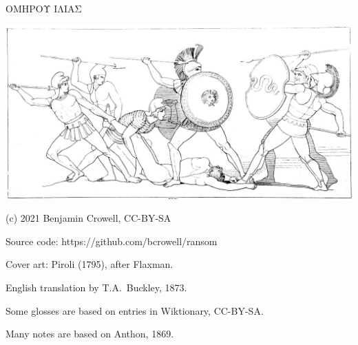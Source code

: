\pagestyle{empty}

\vspace{25mm} %

\begin{center}

{\huge ΟΜΗΡΟΥ ΙΛΙΑΣ }

\vspace{10mm}

\includegraphics{iliad/figs/ajax-and-patroclus-body}

\vfill

\end{center}

\pagebreak

(c) 2021 Benjamin Crowell, CC-BY-SA

Source code: https://github.com/bcrowell/ransom

Cover art: Piroli (1795), after Flaxman.


English translation by T.A.~Buckley, 1873.

Some glosses are based on entries in Wiktionary, CC-BY-SA.

Many notes are based on Anthon, 1869.

\vfill
